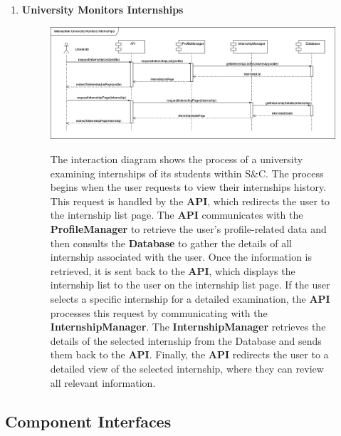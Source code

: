 \begin{enumerate}
    \newpage
    \item \textbf{University Monitors Internships}
    \begin{figure}[h!]
            \centering  \includegraphics[width=1\textwidth]{DD/Images/Interactions/INT19_UniversityMonitorsInternships.drawio.png}
            \label{fig:ComponentViewDiagram}
            \caption*{The interaction diagram shows the process of a university examining internships of its students within S\&C. The process begins when the user requests to view their internships history. This request is handled by the \textbf{API}, which redirects the user to the internship list page. The \textbf{API} communicates with the \textbf{ProfileManager} to retrieve the user’s profile-related data and then consults the \textbf{Database} to gather the details of all internship associated with the user. 
            Once the information is retrieved, it is sent back to the \textbf{API}, which displays the internship list to the user on the internship list page.
            If the user selects a specific internship for a detailed examination, the \textbf{API} processes this request by communicating with the \textbf{InternshipManager}. The \textbf{InternshipManager} retrieves the details of the selected internship from the Database and sends them back to the \textbf{API}. Finally, the \textbf{API} redirects the user to a detailed view of the selected internship, where they can review all relevant information.
            }
    \end{figure}
    
\end{enumerate}
\newpage
\subsection{Component Interfaces}

